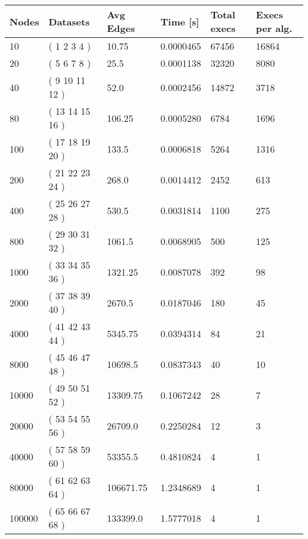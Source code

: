 \begin{longtable}{llllll}
    \textbf{Nodes} & \textbf{Datasets} & \textbf{Avg Edges} & \textbf{Time [s]} & \textbf{Total execs} & \textbf{Execs per alg.} \\
    \endhead
    10             & ( 1 2 3 4 )       & 10.75              & 0.0000465        & 67456                & 16864                   \\
    20             & ( 5 6 7 8 )       & 25.5               & 0.0001138        & 32320                & 8080                    \\
    40             & ( 9 10 11 12 )    & 52.0               & 0.0002456        & 14872                & 3718                    \\
    80             & ( 13 14 15 16 )   & 106.25             & 0.0005280        & 6784                 & 1696                    \\
    100            & ( 17 18 19 20 )   & 133.5              & 0.0006818        & 5264                 & 1316                    \\
    200            & ( 21 22 23 24 )   & 268.0              & 0.0014412        & 2452                 & 613                     \\
    400            & ( 25 26 27 28 )   & 530.5              & 0.0031814        & 1100                 & 275                     \\
    800            & ( 29 30 31 32 )   & 1061.5             & 0.0068905        & 500                  & 125                     \\
    1000           & ( 33 34 35 36 )   & 1321.25            & 0.0087078        & 392                  & 98                      \\
    2000           & ( 37 38 39 40 )   & 2670.5             & 0.0187046        & 180                  & 45                      \\
    4000           & ( 41 42 43 44 )   & 5345.75            & 0.0394314        & 84                   & 21                      \\
    8000           & ( 45 46 47 48 )   & 10698.5            & 0.0837343        & 40                   & 10                      \\
    10000          & ( 49 50 51 52 )   & 13309.75           & 0.1067242        & 28                   & 7                       \\
    20000          & ( 53 54 55 56 )   & 26709.0            & 0.2250284        & 12                   & 3                       \\
    40000          & ( 57 58 59 60 )   & 53355.5            & 0.4810824        & 4                    & 1                       \\
    80000          & ( 61 62 63 64 )   & 106671.75          & 1.2348689        & 4                    & 1                       \\
    100000         & ( 65 66 67 68 )   & 133399.0           & 1.5777018        & 4                    & 1                      
    \end{longtable}


